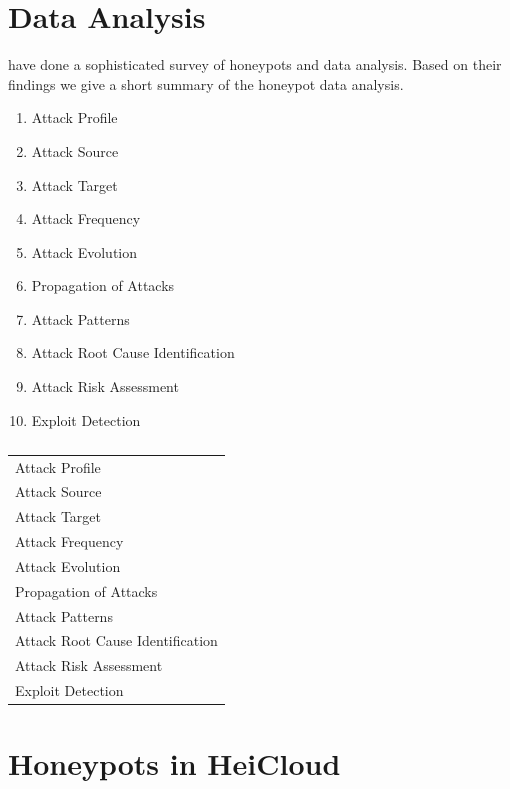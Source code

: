 \section{Data Analysis}

\citet{NawrockiWSKS2016} have done a sophisticated survey of honeypots and data analysis.
Based on their findings we give a short summary of the honeypot data analysis.

\begin{enumerate}
    \item Attack Profile
    \item Attack Source
    \item Attack Target
    \item Attack Frequency
    \item Attack Evolution
    \item Propagation of Attacks
    \item Attack Patterns
    \item Attack Root Cause Identification
    \item Attack Risk Assessment
    \item Exploit Detection
\end{enumerate}

\begin{table}[h]
    \centering
    \caption{}
    \begin{tabularx}{\linewidth}{l}
        \toprule
        Attack Profile                   \\
        Attack Source                    \\
        Attack Target                    \\
        Attack Frequency                 \\
        Attack Evolution                 \\
        Propagation of Attacks           \\
        Attack Patterns                  \\
        Attack Root Cause Identification \\
        Attack Risk Assessment           \\
        Exploit Detection                \\
        \bottomrule
    \end{tabularx}
    \label{tab:overview-data-analysis}
\end{table}


\section{Honeypots in HeiCloud}
\label{sec:honeypots-heicloud}

